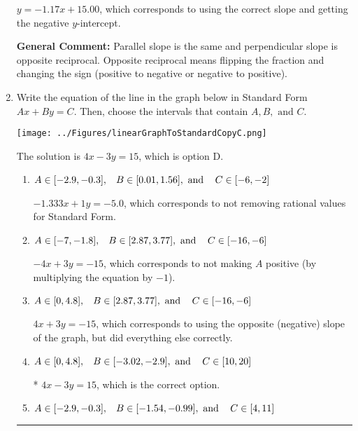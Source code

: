 \documentclass{extbook}[14pt]
\newcommand{\litem}[1]{\item #1

\rule{\textwidth}{0.4pt}}
\begin{document}
\begin{enumerate}
{\begin{enumerate}[label=\Alph*.]
 $y = -1.17x + 15.00$, which corresponds to using the correct slope and getting the negative $y$-intercept.
\end{enumerate}

\textbf{General Comment:} Parallel slope is the same and perpendicular slope is opposite reciprocal. Opposite reciprocal means flipping the fraction and changing the sign (positive to negative or negative to positive).
}
\litem{
Write the equation of the line in the graph below in Standard Form $Ax+By=C$. Then, choose the intervals that contain $A, B, \text{ and } C$.

\begin{center}
    \texttt{[image: ../Figures/linearGraphToStandardCopyC.png]}
\end{center}


The solution is \( 4x - 3y = 15 \), which is option D.\begin{enumerate}[label=\Alph*.]
\item \( A \in [-2.9, -0.3], \hspace{3mm} B \in [0.01, 1.56], \text{ and } \hspace{3mm} C \in [-6, -2] \)

 $-1.333x + 1y = -5.0$, which corresponds to not removing rational values for Standard Form.
\item \( A \in [-7, -1.8], \hspace{3mm} B \in [2.87, 3.77], \text{ and } \hspace{3mm} C \in [-16, -6] \)

 $-4x + 3y = -15$, which corresponds to not making $A$ positive (by multiplying the equation by $-1$).
\item \( A \in [0, 4.8], \hspace{3mm} B \in [2.87, 3.77], \text{ and } \hspace{3mm} C \in [-16, -6] \)

 $4x + 3y = -15$, which corresponds to using the opposite (negative) slope of the graph, but did everything else correctly.
\item \( A \in [0, 4.8], \hspace{3mm} B \in [-3.02, -2.9], \text{ and } \hspace{3mm} C \in [10, 20] \)

* $4x - 3y = 15$, which is the correct option.
\item \( A \in [-2.9, -0.3], \hspace{3mm} B \in [-1.54, -0.99], \text{ and } \hspace{3mm} C \in [4, 11] \)


\end{enumerate}}
\end{enumerate}
\end{document}
